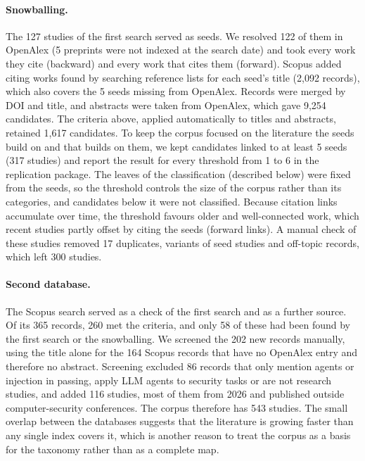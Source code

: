 \documentclass[pdflatex,sn-mathphys-num]{sn-jnl}
\theoremstyle{thmstyleone}%
\theoremstyle{thmstyletwo}%
\theoremstyle{thmstylethree}%
\newcommand{\NSearch}{127}
\newcommand{\NSeedsResolved}{122}
\newcommand{\NSeedsUnresolved}{5}
\newcommand{\NSnowCand}{9{,}254}
\newcommand{\NSnowRule}{1{,}617}
\newcommand{\NLinkK}{5}
\newcommand{\NSnowAtK}{317}
\newcommand{\NSnowManualExcl}{17}
\newcommand{\NSnow}{300}
\newcommand{\NCorpus}{543}
\newcommand{\NScUnique}{365}
\newcommand{\NScRule}{260}
\newcommand{\NScKnown}{58}
\newcommand{\NScNew}{202}
\newcommand{\NScopus}{116}
\newcommand{\NScManualExcl}{86}
\newcommand{\NScCiting}{2{,}092}
\newcommand{\NScOnly}{164}
\begin{document}
\paragraph{Snowballing.} The \NSearch{} studies of the first search served as seeds. We resolved \NSeedsResolved{} of them in OpenAlex (\NSeedsUnresolved{} preprints were not indexed at the search date) and took every work they cite (backward) and every work that cites them (forward). Scopus added citing works found by searching reference lists for each seed's title (\NScCiting{} records), which also covers the \NSeedsUnresolved{} seeds missing from OpenAlex. Records were merged by DOI and title, and abstracts were taken from OpenAlex, which gave \NSnowCand{} candidates. The criteria above, applied automatically to titles and abstracts, retained \NSnowRule{} candidates. To keep the corpus focused on the literature the seeds build on and that builds on them, we kept candidates linked to at least \NLinkK{} seeds (\NSnowAtK{} studies) and report the result for every threshold from 1 to 6 in the replication package. The leaves of the classification (described below) were fixed from the seeds, so the threshold controls the size of the corpus rather than its categories, and candidates below it were not classified. Because citation links accumulate over time, the threshold favours older and well-connected work, which recent studies partly offset by citing the seeds (forward links). A manual check of these studies removed \NSnowManualExcl{} duplicates, variants of seed studies and off-topic records, which left \NSnow{} studies.

\paragraph{Second database.} The Scopus search served as a check of the first search and as a further source. Of its \NScUnique{} records, \NScRule{} met the criteria, and only \NScKnown{} of these had been found by the first search or the snowballing. We screened the \NScNew{} new records manually, using the title alone for the \NScOnly{} Scopus records that have no OpenAlex entry and therefore no abstract. Screening excluded \NScManualExcl{} records that only mention agents or injection in passing, apply LLM agents to security tasks or are not research studies, and added \NScopus{} studies, most of them from 2026 and published outside computer-security conferences. The corpus therefore has \NCorpus{} studies. The small overlap between the databases suggests that the literature is growing faster than any single index covers it, which is another reason to treat the corpus as a basis for the taxonomy rather than as a complete map.
\end{document}
